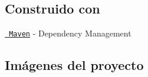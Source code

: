 \begin{DoxyCode}{0}
\end{DoxyCode}



\begin{DoxyCode}{0}
\end{DoxyCode}


\subsection*{Construido con}


\begin{DoxyItemize}
\item \href{https://maven.apache.org/}{\texttt{ Maven}} -\/ Dependency Management
\end{DoxyItemize}

\subsection*{Imágenes del proyecto}

    